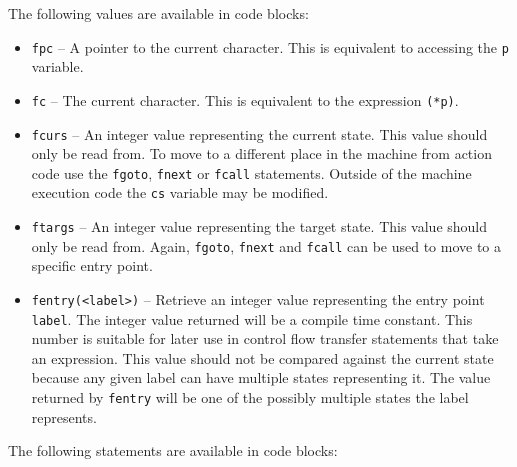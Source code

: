 \documentclass[letterpaper,11pt,oneside]{book}
\begin{document}
\noindent The following values are available in code blocks:

\begin{itemize}
\item \verb|fpc| -- A pointer to the current character. This is equivalent to
accessing the \verb|p| variable.

\item \verb|fc| -- The current character. This is equivalent to the expression \verb|(*p)|.

\item \verb|fcurs| -- An integer value representing the current state. This
value should only be read from. To move to a different place in the machine
from action code use the \verb|fgoto|, \verb|fnext| or \verb|fcall| statements.
Outside of the machine execution code the \verb|cs| variable may be modified.

\item \verb|ftargs| -- An integer value representing the target state. This
value should only be read from. Again, \verb|fgoto|, \verb|fnext| and
\verb|fcall| can be used to move to a specific entry point.

\item \verb|fentry(<label>)| -- Retrieve an integer value representing the
entry point \verb|label|. The integer value returned will be a compile time
constant. This number is suitable for later use in control flow transfer
statements that take an expression. This value should not be compared against
the current state because any given label can have multiple states representing
it. The value returned by \verb|fentry| will be one of the possibly multiple states the
label represents.
\end{itemize}

\noindent The following statements are available in code blocks:
\end{document}

